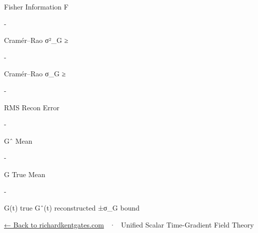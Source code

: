 \documentclass[
  10pt,
]{article}
\begin{document}
Fisher Information F

\hypertarget{r-f}{}
-

Cramér--Rao σ²\_G ≥

\hypertarget{r-cr}{}
-

Cramér--Rao σ\_G ≥

\hypertarget{r-crs}{}
-

RMS Recon Error

\hypertarget{r-rms}{}
-

Gˆ Mean

\hypertarget{r-gmean}{}
-

G True Mean

\hypertarget{r-tmean}{}
-

{{} G(t) true} {{} Gˆ(t) reconstructed} {{} ±σ\_G bound}

\href{https://richardkentgates.com}{← Back to richardkentgates.com} ~·~
Unified Scalar Time-Gradient Field Theory
\end{document}
